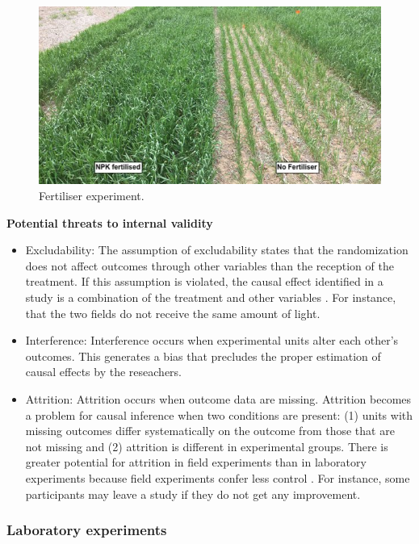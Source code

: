 \documentclass[
]{book}
\begin{document}
\begin{figure}

{\centering \includegraphics[width=0.66\linewidth]{Figures/crop} 

}

\caption{Fertiliser experiment.}\label{fig:fertiliser}
\end{figure}

\textbf{Potential threats to internal validity}

\begin{itemize}
\item
  Excludability: The assumption of excludability states that the randomization does not affect outcomes through other variables than the reception of the treatment. If this assumption is violated, the causal effect identified in a study is a combination of the treatment and other variables \citep{hansen2020systematic}. For instance, that the two fields do not receive the same amount of light.
\item
  Interference: Interference occurs when experimental units alter each other's outcomes. This generates a bias that precludes the proper estimation of causal effects by the reseachers.
\item
  Attrition: Attrition occurs when outcome data are missing. Attrition becomes a problem for causal inference when two conditions are present: (1) units with missing outcomes differ systematically on the outcome from those that are not missing and (2) attrition is different in experimental groups. There is greater potential for attrition in field experiments than in laboratory experiments because field experiments confer less control \citep{hansen2020systematic}. For instance, some participants may leave a study if they do not get any improvement.
\end{itemize}

\hypertarget{laboratory-experiments}{%
\subsubsection{Laboratory experiments}\label{laboratory-experiments}}
\end{document}
